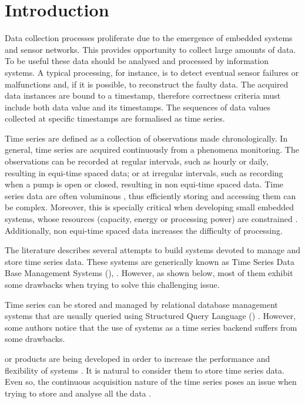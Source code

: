 \section{Introduction}

Data collection processes proliferate due to the emergence of embedded
systems and sensor networks.  This provides opportunity to collect
large amounts of data. To be useful these data should be analysed and
processed by information systems. A typical processing, for instance,
is to detect eventual sensor failures or malfunctions and, if it is
possible, to reconstruct the faulty data. The acquired data instances
are bound to a timestamp, therefore correctness criteria must include
both data value and its timestamps. The sequences of data values
collected at specific timestamps are formalised as time series.

Time series are defined as a collection of observations made
chronologically.  In general, time series are acquired continuously
from a phenomena monitoring. The observations can be recorded at
regular intervals, such as hourly or daily, resulting in equi-time
spaced data; or at irregular intervals, such as recording when a pump
is open or closed, resulting in non equi-time spaced data. Time series
data are often voluminous \cite{fu11,keogh08:isax}, thus efficiently
storing and accessing them can be complex. Moreover, this is specially
critical when developing small embedded systems, whose resources
(capacity, energy or processing power) are constrained
\cite{yaogehrke02}.  Additionally, non equi-time spaced data increases
the difficulty of processing.

The literature describes several attempts to build systems devoted to
manage and store time series data. These systems are generically known
as Time Series Data Base Management Systems (),
\cite{dreyer94,last01}. However, as shown below, most of them exhibit
some drawbacks when trying to solve this challenging issue.

Time series can be stored and managed by relational database
management systems that are usually queried using Structured Query
Language () .
%
However, some authors
\cite{dreyer94,schmidt95,stonebraker09:scidb,zhang11} notice that the
use of  systems as a time series backend suffers from some
drawbacks.

 or  products are being developed in order to
increase the performance and flexibility of  systems
\cite{atzeni13:relational_model_dead,stonebraker10,stonebraker09:scidb,zhang11}.
%
It is natural to consider them to store time series data. Even so, the
continuous acquisition nature of the time series poses an issue when
trying to store and analyse all the data \cite{keogh97}.

